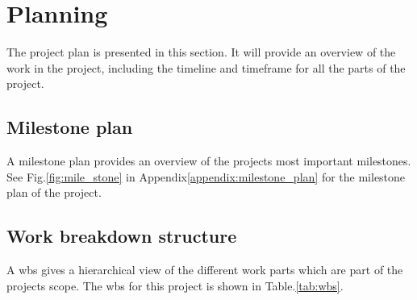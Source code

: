 \section{Planning}
\label{section:planning}

The project plan is presented in this section. It will provide an overview of the work in the project, including the timeline and timeframe for all the parts of the project.

\subsection{Milestone plan}

A milestone plan provides an overview of the projects most important milestones\:\cite{tonnquist_project_2021}.
See Fig.\:\ref{fig:mile_stone} in Appendix\:\ref{appendix:milestone_plan} for the milestone plan of the project.



\subsection{Work breakdown structure}

A \ac{wbs} gives a hierarchical view of the different work parts which are part of the projects scope\:\cite{tonnquist_project_2021}.
The \ac{wbs} for this project is shown in Table.\:\ref{tab:wbs}.

